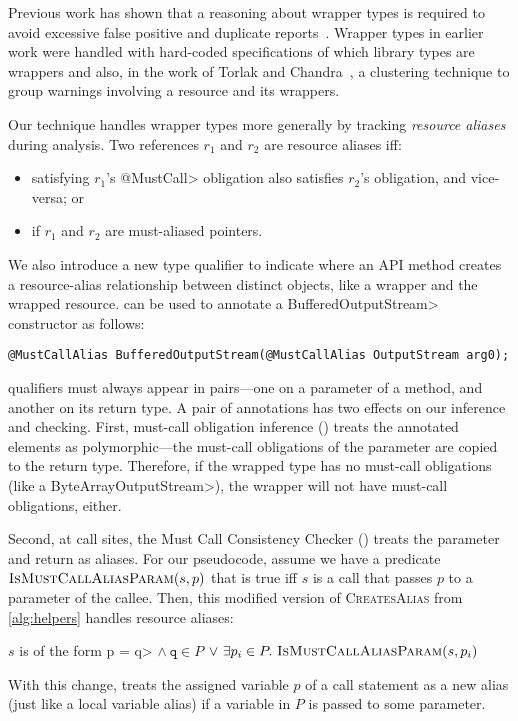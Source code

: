 Previous work has shown that a reasoning about wrapper types is
required to avoid excessive false positive and duplicate
reports~\cite{TorlakC10,ecj-resource-leak}.  Wrapper types in earlier
work were handled with hard-coded specifications of which library
types are wrappers and also, in the work of Torlak and
Chandra~\cite{TorlakC10}, a clustering technique to group warnings
involving a resource and its wrappers.  

Our technique handles wrapper types more generally by tracking \emph{resource
aliases} during analysis.  Two references $r_1$ and $r_2$ are resource aliases
iff:
\begin{itemize}
\item satisfying $r_1$'s \<@MustCall> obligation also satisfies $r_2$'s
  obligation, and vice-versa; or
\item if $r_1$ and $r_2$ are must-aliased pointers.
\end{itemize}
We also introduce a new type
qualifier \mccannot to indicate where an API method creates a resource-alias
relationship between distinct objects, like a wrapper and the wrapped resource.
\mccannot can be used to annotate a \<BufferedOutputStream> constructor as follows:
\begin{lstlisting}
@MustCallAlias BufferedOutputStream(@MustCallAlias OutputStream arg0);
\end{lstlisting}

\mccannot qualifiers must always appear in pairs---one on a parameter
of a method, and another on its return type.  A pair of \mccannot
annotations has two effects on our inference and checking.  First,
must-call obligation inference () treats the
annotated elements as polymorphic---the must-call obligations of the
parameter are copied to the return type. Therefore, if the wrapped
type has no must-call obligations (like a \<ByteArrayOutputStream>),
the wrapper will not have must-call obligations, either.

Second, at call sites, the Must Call Consistency Checker
() treats the \mccannot parameter and return as
aliases.  For our  pseudocode, assume we have a
predicate $\textsc{IsMust\-CallAliasParam}(s,p)$ that is true iff $s$ is a call that
passes $p$ to a \mccannot parameter of the callee.  Then, this modified
version of \textsc{CreatesAlias} from \cref{alg:helpers} handles resource aliases:
\begin{algorithmic}
    \State \Return $s$ is of the form \<p = q> $\wedge\ \mathtt{q} \in P$ \newline
         \hspace*{4.5em} $\vee\ \exists p_i \in P.\ \textsc{IsMustCallAliasParam}(s,p_i)$ 
    \EndProcedure
\end{algorithmic}
With this change,  treats the
assigned variable $p$ of a call statement as a new alias (just like a local
variable alias) if a 
variable in $P$ is passed to some \mccannot parameter.


